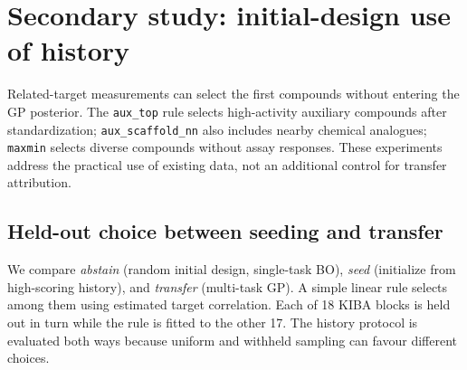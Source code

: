 \documentclass[10pt]{article}
\newcommand{\auxtop}{\texttt{aux\_top}}
\newcommand{\auxnn}{\texttt{aux\_scaffold\_nn}}
\newcommand{\maxmin}{\texttt{maxmin}}
\begin{document}
\section{Secondary study: initial-design use of history}
\label{app:secondary}

Related-target measurements can select the first compounds without entering
the GP posterior. The \auxtop{} rule selects high-activity auxiliary
compounds after standardization; \auxnn{} also includes nearby chemical
analogues; \maxmin{} selects diverse compounds without assay responses.
These experiments address the practical use of existing data, not an
additional control for transfer attribution.

\subsection{Held-out choice between seeding and transfer}
\label{sec:res-rule}

We compare \emph{abstain} (random initial design, single-task BO),
\emph{seed} (initialize from high-scoring history), and \emph{transfer}
(multi-task GP). A simple linear rule selects among them using estimated
target correlation. Each of 18 KIBA blocks is held out in turn while the rule
is fitted to the other 17. The history protocol is evaluated both ways
because uniform and withheld sampling can favour different choices.
\end{document}

